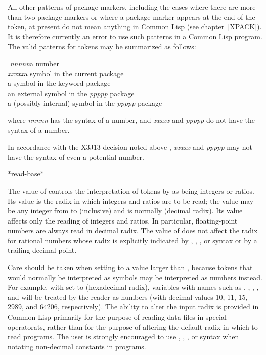 All other patterns of package markers,
including the cases where there are more than two
package markers or where a package marker appears at the end of the token,
at present do not mean anything in Common Lisp (see chapter~\ref{XPACK}).
It is therefore currently an error to use such patterns in a Common Lisp program.
The valid patterns for tokens may be summarized as follows:
\begin{tabbing}
\hskip 8pc\=\kill
\emph{nnnnn}\>a number \\
\emph{xxxxx}\>a symbol in the current package \\
\>a symbol in the keyword package \\
\>an external symbol in the \emph{ppppp} package \\
\>a (possibly internal) symbol in the \emph{ppppp} package
\end{tabbing}
where \emph{nnnnn} has the syntax of a number, and \emph{xxxxx} and \emph{ppppp} do
not have the syntax of a number.

\begin{new}
In accordance with the X3J13 decision noted above
, \emph{xxxxx} and \emph{ppppp} may not have the syntax of even
a potential number.
\end{new}

\begin{defun}[Variable]
*read-base*

The value of  controls the interpretation of tokens
by  as being integers or ratios.  Its value is the radix
in which integers and ratios are to be read; the value may be any integer
from  to  (inclusive) and is normally  (decimal radix).
Its value affects only the reading of integers and ratios.
In particular, floating-point numbers are always read in decimal radix.
The value of  does not affect the radix for rational numbers
whose radix is explicitly indicated by
, , , or  syntax
or by a trailing decimal point.

Care should be taken when setting  to a value larger
than , because tokens that would normally be interpreted as
symbols may be interpreted as numbers instead.  For example,
with  set to  (hexadecimal radix), variables
with names such as , , , , and 
will be treated by the reader as numbers (with decimal values
10, 11, 15, 2989, and 64206, respectively).  The ability to alter
the input radix is provided in Common Lisp primarily for the purpose of
reading data files in special operatorats, rather than for the purpose of altering
the default radix in which to read programs.  The user is strongly
encouraged to use , , , or  syntax when
notating non-decimal constants in programs.
\end{defun}

